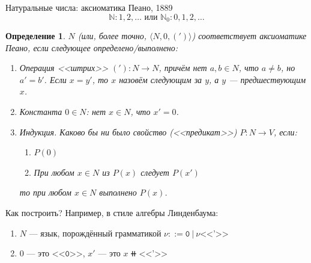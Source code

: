 \documentclass[aspectratio=169]{beamer}
\newtheorem{dfn}{Определение}[section]
\begin{document}
\begin{frame}{Натуральные числа: аксиоматика Пеано, 1889}\vspace{-0.5cm}
 $$\mathbb{N}: 1, 2, \dots \mbox{ или } \mathbb{N}_0: 0, 1, 2, \dots$$\vspace{-1cm}\pause
\begin{dfn}
  $N$ (или, более точно, $\langle N, 0, (')\rangle$) \emph{соответствует} аксиоматике Пеано, 
  если следующее определено/выполнено:\pause
  \begin{enumerate}
     \item Операция <<штрих>> $('): N \to N$, причём нет $a,b \in N$, что $a \ne b$, но $a' = b'$.\pause
           Если $x = y'$, то $x$ назовём следующим за $y$, а $y$ --- предшествующим $x$.\pause
     \item Константа $0 \in N$: нет $x \in N$, что $x' = 0$.\pause
     \item Индукция. Каково бы ни было свойство (<<предикат>>) $P: N \to V$, если:
           \begin{enumerate}
           \item $P(0)$
           \item При любом $x\in N$ из $P(x)$ следует $P(x')$
           \end{enumerate}
           то при любом $x \in N$ выполнено $P(x)$.
  \end{enumerate}
\end{dfn}\pause
Как построить? Например, в стиле алгебры Линденбаума:\pause
\begin{enumerate}
\item $N$ --- язык, порождённый грамматикой $\nu ::= \texttt{0}\ |\ \nu \texttt{<<'>>}$\pause
\item $0$ --- это $\texttt{<<0>>}$, $x'$ --- это $x \doubleplus \texttt{<<'>>}$
\end{enumerate}
\end{frame}
\end{document}
